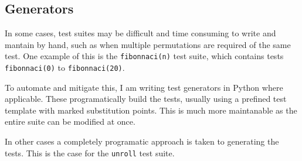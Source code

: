 \subsection{Generators}

In some cases, test suites may be difficult and time consuming to write and mantain by hand, such as when multiple permutations are required of the same test. One example of this is the \texttt{fibonnaci(n)} test suite, which contains tests \texttt{fibonnaci(0)} to \texttt{fibonnaci(20)}.

To automate and mitigate this, I am writing test generators in Python where applicable. These programatically build the tests, usually using a prefined test template with marked substitution points. This is much more maintanable as the entire suite can be modified at once.

In other cases a completely programatic approach is taken to generating the tests. This is the case for the \texttt{unroll} test suite.